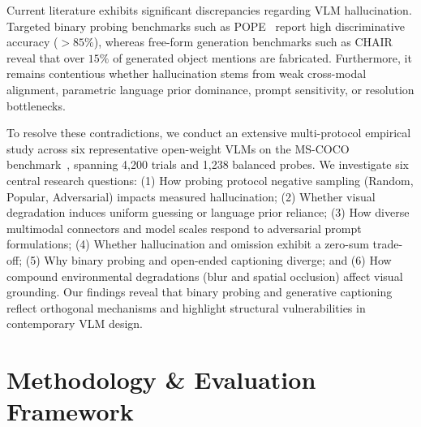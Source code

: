 \documentclass[conference]{IEEEtran}
\begin{document}
Current literature exhibits significant discrepancies regarding VLM hallucination. Targeted binary probing benchmarks such as POPE~\cite{li2023evaluating} report high discriminative accuracy ($>85\%$), whereas free-form generation benchmarks such as CHAIR~\cite{rohrbach2018chair} reveal that over $15\%$ of generated object mentions are fabricated. Furthermore, it remains contentious whether hallucination stems from weak cross-modal alignment, parametric language prior dominance, prompt sensitivity, or resolution bottlenecks.

To resolve these contradictions, we conduct an extensive multi-protocol empirical study across six representative open-weight VLMs on the MS-COCO benchmark~\cite{lin2014microsoft}, spanning 4,200 trials and 1,238 balanced probes. We investigate six central research questions: (1) How probing protocol negative sampling (Random, Popular, Adversarial) impacts measured hallucination; (2) Whether visual degradation induces uniform guessing or language prior reliance; (3) How diverse multimodal connectors and model scales respond to adversarial prompt formulations; (4) Whether hallucination and omission exhibit a zero-sum trade-off; (5) Why binary probing and open-ended captioning diverge; and (6) How compound environmental degradations (blur and spatial occlusion) affect visual grounding. Our findings reveal that binary probing and generative captioning reflect orthogonal mechanisms and highlight structural vulnerabilities in contemporary VLM design.

\section{Methodology \& Evaluation Framework}
\end{document}
